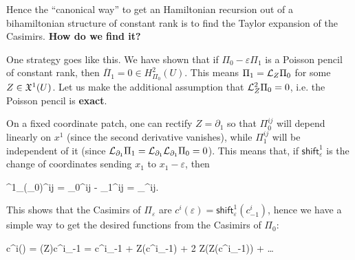 \documentclass[main.tex]{subfiles}
\begin{document}
Hence the ``canonical way'' to get an Hamiltonian recursion out of a bihamiltonian structure of constant rank is to find the Taylor expansion of the Casimirs. \textbf{How do we find it?}

\begin{construction}
	One strategy goes like this. We have shown that if $\Pi_0-\varepsilon\Pi_1$ is a Poisson pencil of constant rank, then $\overline \Pi_1 = 0 \in H_{\Pi_0}^2(U)$. This means $\Pi_1 = \mathcal{L}_{Z}\Pi_0$ for some $Z \in \mathfrak{X}^1(U)$. Let us make the additional assumption that $\mathcal{L}_{Z}^2\Pi_0 = 0$, i.e. the Poisson pencil is \textbf{exact}.

	On a fixed coordinate patch, one can rectify $Z = \partial_1$ so that $\Pi_0^{ij}$ will depend linearly on $x^1$ (since the second derivative vanishes), while $\Pi_1^{ij}$ will be independent of it (since $\mathcal{L}_{\partial_1} \Pi_1 = \mathcal{L}_{\partial_1}\mathcal{L}_{\partial_1}\Pi_0 = 0$). This means that, if $\mathsf{shift}^1_\varepsilon$ is the change of coordinates sending $x_1$ to $x_1 - \varepsilon$, then
	\begin{eqalign}
		^1_\varepsilon(\Pi_0)^{ij} = \Pi_0^{ij} - \varepsilon \Pi_1^{ij} = \Pi_\varepsilon^{ij}.
	\end{eqalign}
	This shows that the Casimirs of $\Pi_\varepsilon$ are $c^i(\varepsilon) = \mathsf{shift}^1_\varepsilon(c^i_{-1})$, hence we have a simple way to get the desired functions from the Casimirs of $\Pi_0$:
	\begin{eqalign}
		c^i(\varepsilon) = \exp(\varepsilon Z)c^i_{-1} = c^i_{-1} + \varepsilon Z(c^i_{-1}) + 2 Z(Z(c^i_{-1})) + \ldots
	\end{eqalign}
\end{construction}
\end{document}
